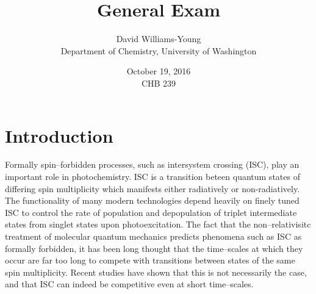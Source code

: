 \documentclass[12pt]{article}
\title{General Exam}
\date{October 19, 2016 \\ CHB 239}
\author{David Williams-Young\\ Department of Chemistry, University of Washington}
\begin{document}
\linespread{1.0}
\maketitle
\linespread{1.5}

\newpage
\section{Introduction}

Formally spin--forbidden processes, such as intersystem crossing (ISC),  play an
important role in photochemistry. ISC is a transition beteen quantum states of
differing spin multiplicity which manifests either radiatively or
non-radiatively.  The functionality of many modern technologies depend heavily
on finely tuned ISC to control the rate of population and depopulation of
triplet intermediate states from singlet states upon photoexcitation. The fact
that the non--relativisitc treatment of molecular quantum mechanics predicts
phenomena such as ISC as formally forbidden, it has been long thought that the
time--scales at which they occur are far too long to compete with transitions
between states of the same spin multiplicity. Recent studies have shown that
this is not necessarily the case, and that ISC can indeed be competitive even at
short time--scales.

\linespread{1.0}

\end{document}
